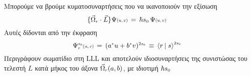 Μπορούμε να βρούμε κυματοσυναρτήσεις που να ικανοποιούν την εξίσωση \cite{PhysRevLett.51.605} 
\begin{equation}\label{haldane eigenvalue equation}
    \{\vec{\Omega}\subscr{r}\cdot\Vec{L}\} \Psi\text{\scalebox{0.7}{$(u,v)$}}\,=\,\hbar s\subscr{0}\,\Psi\text{\scalebox{0.7}{$(u,v)$}}
\end{equation}
Αυτές δίδονται από την έκφραση
\begin{equation}\label{Haldane polynomial}
    \Psi\subscr{r}\superscr{s\subscr{0}}\text{\scalebox{0.7}{$(u,v)$}}\,=\,(a\superscr{*}u+b\superscr{*}v)\superscr{2s\subscr{0}}\,\equiv\,\left<r\,\right|\left.s\right>\superscr{2s\subscr{0}}
\end{equation}
Περιγράφουν σωματίδιο στη LLL και αποτελούν ιδιοσυναρτήσεις της συνιστώσας του τελεστή $L$ κατά μήκος του άξονα  $\vec{\Omega}\subscr{r}(a,b)$, με ιδιοτιμή $\hbar s\subscr{0}$ %
